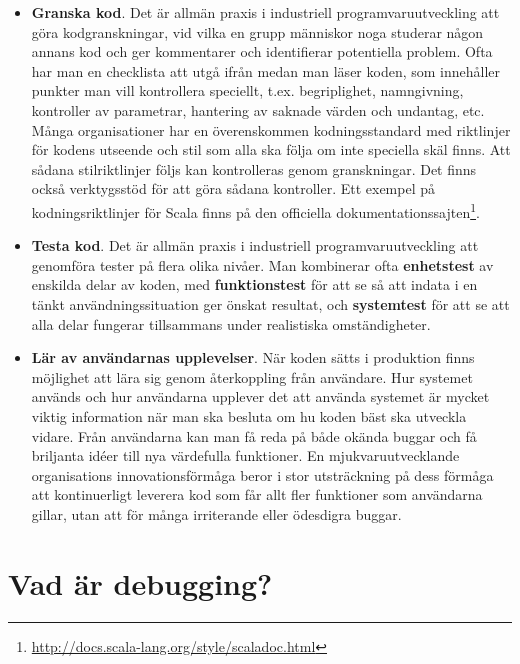 \begin{itemize}
\item \textbf{Granska kod}. Det är allmän praxis i industriell programvaruutveckling att göra kodgranskningar, vid vilka en grupp människor noga studerar någon annans kod och ger kommentarer och identifierar potentiella problem. Ofta har man en checklista att utgå ifrån medan man läser koden, som innehåller punkter man vill kontrollera speciellt, t.ex. begriplighet, namngivning, kontroller av parametrar, hantering av saknade värden och undantag, etc. Många organisationer har en överenskommen kodningsstandard med riktlinjer för kodens utseende och stil som alla ska följa om inte speciella skäl finns. Att sådana stilriktlinjer följs kan kontrolleras genom granskningar. Det finns också verktygsstöd för att göra sådana kontroller. Ett exempel på kodningsriktlinjer för Scala finns på den officiella dokumentationssajten\footnote{\url{http://docs.scala-lang.org/style/scaladoc.html}}. 

\item \textbf{Testa kod}. Det är allmän praxis i industriell programvaruutveckling att genomföra tester på flera olika nivåer. Man kombinerar ofta \textbf{enhetstest}  av enskilda delar av koden, med \textbf{funktionstest}  för att se så att indata i en tänkt användningssituation ger önskat resultat, och \textbf{systemtest}  för att se att alla delar fungerar tillsammans under realistiska omständigheter. 

\item \textbf{Lär av användarnas upplevelser}. När koden sätts i produktion finns möjlighet att lära sig genom återkoppling från användare. Hur systemet används och hur användarna upplever det att använda systemet är mycket viktig information när man ska besluta om hu koden bäst ska utveckla vidare. Från användarna kan man få reda på både okända buggar och få briljanta idéer till nya värdefulla funktioner. En mjukvaruutvecklande organisations innovationsförmåga beror i stor utsträckning på dess förmåga att kontinuerligt leverera kod som får allt fler funktioner som användarna gillar, utan att för många irriterande eller ödesdigra buggar.

\end{itemize}



\section{Vad är debugging?}

